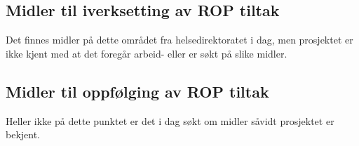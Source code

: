 \documentclass[11pt]{report} %
\begin{document}
                  \subsection{Midler til iverksetting av ROP tiltak}\label{sec:vv_mid_iverksetting_ROP}
                    Det finnes midler på dette området fra helsedirektoratet i dag, men prosjektet er ikke kjent med at det foregår arbeid- eller er søkt på slike midler.
                  \subsection{Midler til oppfølging av ROP tiltak}\label{sec:vv_mid_oppf_ROP}
                    Heller ikke på dette punktet er det i dag søkt om midler såvidt prosjektet er bekjent. 


              
\end{document}
